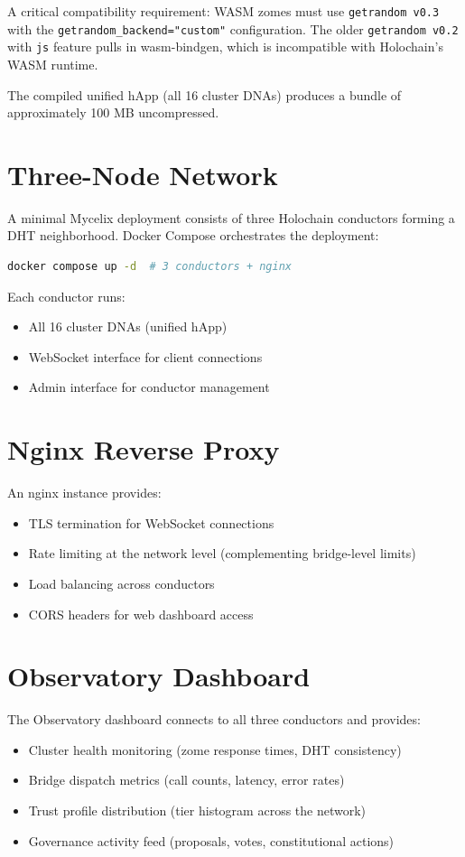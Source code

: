 \documentclass[12pt]{book}
\begin{document}
A critical compatibility requirement: WASM zomes must use \texttt{getrandom v0.3}
with the \texttt{getrandom\_backend="custom"} configuration. The older
\texttt{getrandom v0.2} with \texttt{js} feature pulls in wasm-bindgen,
which is incompatible with Holochain's WASM runtime.

The compiled unified hApp (all 16 cluster DNAs) produces a bundle of
approximately 100 MB uncompressed.

\section{Three-Node Network}

A minimal Mycelix deployment consists of three Holochain conductors forming
a DHT neighborhood. Docker Compose orchestrates the deployment:

\begin{lstlisting}[language=bash,caption={Docker deployment (simplified)}]
docker compose up -d  # 3 conductors + nginx
\end{lstlisting}

Each conductor runs:
\begin{itemize}
  \item All 16 cluster DNAs (unified hApp)
  \item WebSocket interface for client connections
  \item Admin interface for conductor management
\end{itemize}

\section{Nginx Reverse Proxy}

An nginx instance provides:
\begin{itemize}
  \item TLS termination for WebSocket connections
  \item Rate limiting at the network level (complementing bridge-level limits)
  \item Load balancing across conductors
  \item CORS headers for web dashboard access
\end{itemize}

\section{Observatory Dashboard}

The Observatory dashboard connects to all three conductors and provides:
\begin{itemize}
  \item Cluster health monitoring (zome response times, DHT consistency)
  \item Bridge dispatch metrics (call counts, latency, error rates)
  \item Trust profile distribution (tier histogram across the network)
  \item Governance activity feed (proposals, votes, constitutional actions)
\end{itemize}
\end{document}
